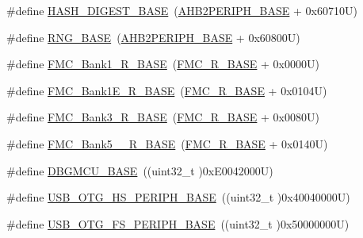 \begin{DoxyCompactItemize}
\item 
\#define \hyperlink{group___peripheral__memory__map_ga41efdf0e6db11dad3003d01882ee8bcb}{H\+A\+S\+H\+\_\+\+D\+I\+G\+E\+S\+T\+\_\+\+B\+A\+SE}~(\hyperlink{group___peripheral__memory__map_gaeedaa71d22a1948492365e2cd26cfd46}{A\+H\+B2\+P\+E\+R\+I\+P\+H\+\_\+\+B\+A\+SE} + 0x60710\+U)
\item 
\#define \hyperlink{group___peripheral__memory__map_gab92662976cfe62457141e5b4f83d541c}{R\+N\+G\+\_\+\+B\+A\+SE}~(\hyperlink{group___peripheral__memory__map_gaeedaa71d22a1948492365e2cd26cfd46}{A\+H\+B2\+P\+E\+R\+I\+P\+H\+\_\+\+B\+A\+SE} + 0x60800\+U)
\item 
\#define \hyperlink{group___peripheral__memory__map_ga1d581e6f64ed2e5d97c11c58285a21b6}{F\+M\+C\+\_\+\+Bank1\+\_\+\+R\+\_\+\+B\+A\+SE}~(\hyperlink{group___peripheral__memory__map_ga7a599164cd92798542bc6288793d1ed5}{F\+M\+C\+\_\+\+R\+\_\+\+B\+A\+SE} + 0x0000\+U)
\item 
\#define \hyperlink{group___peripheral__memory__map_gad82d3a6bac014fa645fb67a63fae4bc0}{F\+M\+C\+\_\+\+Bank1\+E\+\_\+\+R\+\_\+\+B\+A\+SE}~(\hyperlink{group___peripheral__memory__map_ga7a599164cd92798542bc6288793d1ed5}{F\+M\+C\+\_\+\+R\+\_\+\+B\+A\+SE} + 0x0104\+U)
\item 
\#define \hyperlink{group___peripheral__memory__map_gaf570671195a13f4bb2a1b8f2bd5305c9}{F\+M\+C\+\_\+\+Bank3\+\_\+\+R\+\_\+\+B\+A\+SE}~(\hyperlink{group___peripheral__memory__map_ga7a599164cd92798542bc6288793d1ed5}{F\+M\+C\+\_\+\+R\+\_\+\+B\+A\+SE} + 0x0080\+U)
\item 
\#define \hyperlink{group___peripheral__memory__map_gace117149a4fc0d07c38cc997fe4c4a73}{F\+M\+C\+\_\+\+Bank5\+\_\+\_\+\+R\+\_\+\+B\+A\+SE}~(\hyperlink{group___peripheral__memory__map_ga7a599164cd92798542bc6288793d1ed5}{F\+M\+C\+\_\+\+R\+\_\+\+B\+A\+SE} + 0x0140\+U)
\item 
\#define \hyperlink{group___peripheral__memory__map_ga4adaf4fd82ccc3a538f1f27a70cdbbef}{D\+B\+G\+M\+C\+U\+\_\+\+B\+A\+SE}~((uint32\+\_\+t )0x\+E0042000\+U)
\item 
\#define \hyperlink{group___peripheral__memory__map_gaa405d2ebfd7e9394237b6639f16a5409}{U\+S\+B\+\_\+\+O\+T\+G\+\_\+\+H\+S\+\_\+\+P\+E\+R\+I\+P\+H\+\_\+\+B\+A\+SE}~((uint32\+\_\+t )0x40040000\+U)
\item 
\#define \hyperlink{group___peripheral__memory__map_gaa86d4c80849a74938924e73937b904e7}{U\+S\+B\+\_\+\+O\+T\+G\+\_\+\+F\+S\+\_\+\+P\+E\+R\+I\+P\+H\+\_\+\+B\+A\+SE}~((uint32\+\_\+t )0x50000000\+U)
\item 

\end{DoxyCompactItemize}
